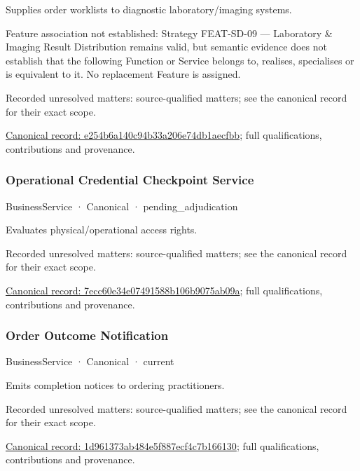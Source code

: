 Supplies order worklists to diagnostic laboratory/imaging systems.



Feature association not established: Strategy FEAT-SD-09 — Laboratory \& Imaging Result Distribution remains valid, but semantic evidence does not establish that the following Function or Service belongs to, realises, specialises or is equivalent to it. No replacement Feature is assigned.


{\small Recorded unresolved matters: source-qualified matters; see the canonical record for their exact scope.}\par
{\footnotesize \href{../../../../continuum/business/business-service/e254b6a140c94b33a206e74db1aecfbb.md}{Canonical record: e254b6a140c94b33a206e74db1aecfbb}; full qualifications, contributions and provenance.}\par
\subsubsection{Operational Credential Checkpoint Service}

\label{element:7ecc60e34e07491588b106b9075ab09a}
{\small BusinessService · Canonical · pending\_adjudication}\par

Evaluates physical/operational access rights.


{\small Recorded unresolved matters: source-qualified matters; see the canonical record for their exact scope.}\par
{\footnotesize \href{../../../../continuum/business/business-service/7ecc60e34e07491588b106b9075ab09a.md}{Canonical record: 7ecc60e34e07491588b106b9075ab09a}; full qualifications, contributions and provenance.}\par
\subsubsection{Order Outcome Notification}

\label{element:1d961373ab484e5f887ecf4c7b166130}
{\small BusinessService · Canonical · current}\par

Emits completion notices to ordering practitioners.


{\small Recorded unresolved matters: source-qualified matters; see the canonical record for their exact scope.}\par
{\footnotesize \href{../../../../continuum/business/business-service/1d961373ab484e5f887ecf4c7b166130.md}{Canonical record: 1d961373ab484e5f887ecf4c7b166130}; full qualifications, contributions and provenance.}\par
